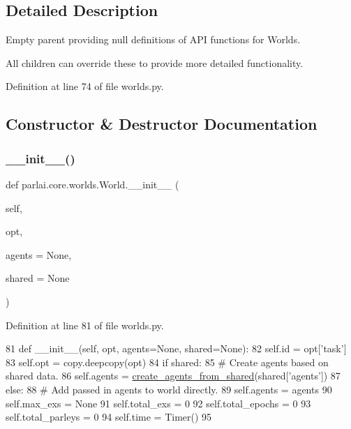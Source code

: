 \subsection{Detailed Description}
\begin{DoxyVerb}Empty parent providing null definitions of API functions for Worlds.

All children can override these to provide more detailed functionality.
\end{DoxyVerb}
 

Definition at line 74 of file worlds.\+py.



\subsection{Constructor \& Destructor Documentation}
\mbox{\label{classparlai_1_1core_1_1worlds_1_1World_a8824b02453596976aab9389d2cae2a2f}} 
\subsubsection{\texorpdfstring{\+\_\+\+\_\+init\+\_\+\+\_\+()}{\_\_init\_\_()}}
{\footnotesize\ttfamily def parlai.\+core.\+worlds.\+World.\+\_\+\+\_\+init\+\_\+\+\_\+ (\begin{DoxyParamCaption}\item[{}]{self,  }\item[{}]{opt,  }\item[{}]{agents = {\ttfamily None},  }\item[{}]{shared = {\ttfamily None} }\end{DoxyParamCaption})}



Definition at line 81 of file worlds.\+py.


\begin{DoxyCode}
81     \textcolor{keyword}{def }\_\_init\_\_(self, opt, agents=None, shared=None):
82         self.id = opt[\textcolor{stringliteral}{'task'}]
83         self.opt = copy.deepcopy(opt)
84         \textcolor{keywordflow}{if} shared:
85             \textcolor{comment}{# Create agents based on shared data.}
86             self.agents = \hyperlink{namespaceparlai_1_1core_1_1agents_a5600530545f5e60a79e2d657b5af1d8c}{create\_agents\_from\_shared}(shared[\textcolor{stringliteral}{'agents'}])
87         \textcolor{keywordflow}{else}:
88             \textcolor{comment}{# Add passed in agents to world directly.}
89             self.agents = agents
90         self.max\_exs = \textcolor{keywordtype}{None}
91         self.total\_exs = 0
92         self.total\_epochs = 0
93         self.total\_parleys = 0
94         self.time = Timer()
95 
\end{DoxyCode}


